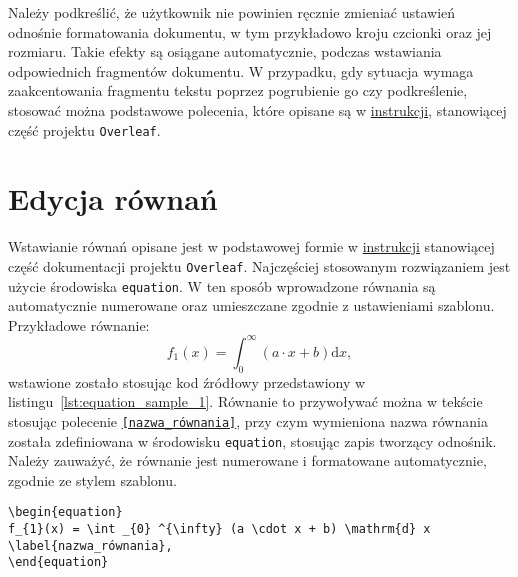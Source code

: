 Należy podkreślić, że użytkownik nie powinien ręcznie zmieniać ustawień odnośnie formatowania dokumentu, w tym przykładowo kroju czcionki oraz jej rozmiaru. Takie efekty są osiągane automatycznie, podczas wstawiania odpowiednich fragmentów dokumentu. W przypadku, gdy sytuacja wymaga zaakcentowania fragmentu tekstu poprzez pogrubienie go czy podkreślenie, stosować można podstawowe polecenia, które opisane są w \href{https://www.overleaf.com/learn/latex/Font_sizes%2C_families%2C_and_styles}{instrukcji}, stanowiącej część projektu \texttt{Overleaf}.

\section{Edycja równań}

Wstawianie równań opisane jest w podstawowej formie w \href{https://www.overleaf.com/learn/latex/Mathematical_expressions}{instrukcji} stanowiącej część dokumentacji projektu \texttt{Overleaf}. Najczęściej stosowanym rozwiązaniem jest użycie środowiska \texttt{equation}. W ten sposób wprowadzone równania są automatycznie numerowane oraz umieszczane zgodnie z ustawieniami szablonu. Przykładowe równanie:
\begin{equation}
f_{1}(x) = \int _{0} ^{\infty} (a \cdot x + b) \mathrm{d}x \label{eq:equation_sample_1},
\end{equation}
wstawione zostało stosując kod źródłowy przedstawiony w listingu~\ref{lst:equation_sample_1}. Równanie to przywoływać można w tekście stosując polecenie \texttt{\eqref{nazwa_równania}}, przy czym wymieniona nazwa równania została zdefiniowana w środowisku \texttt{equation}, stosując zapis \texttt{\label{nazwa_równania}} tworzący odnośnik. Należy zauważyć, że równanie jest numerowane i formatowane automatycznie, zgodnie ze stylem szablonu.

\begin{listing}[htb]
\begin{verbatim}
\begin{equation}
f_{1}(x) = \int _{0} ^{\infty} (a \cdot x + b) \mathrm{d} x \label{nazwa_równania},
\end{equation}
\end{verbatim}
\end{listing}

